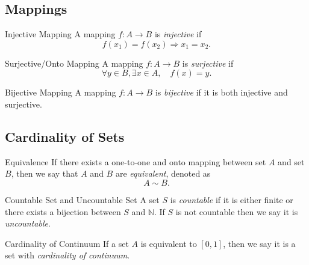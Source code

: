 \subsection{Mappings}

\begin{definition}{Injective Mapping}{}
  A mapping $f:A \rightarrow B$ is \emph{injective} if
  \begin{equation}
    f(x_1) = f(x_2) \Rightarrow x_1 = x_2.
  \end{equation}
\end{definition}

\begin{definition}{Surjective/Onto Mapping}{}
  A mapping $f:A \rightarrow B$ is \emph{surjective} if
  \begin{equation}
    \forall y \in B, \exists x \in A, \quad f(x) = y.
  \end{equation}
\end{definition}

\begin{definition}{Bijective Mapping}{}
  A mapping $f:A \rightarrow B$ is \emph{bijective} if it is both injective and surjective.
\end{definition}

\subsection{Cardinality of Sets}

\begin{definition}{Equivalence}{}
  If there exists a one-to-one and onto mapping between set $A$ and set $B$,
  then we say that $A$ and $B$ are \emph{equivalent}, denoted as
  \begin{equation}
    A \sim B.
  \end{equation}
\end{definition}

\begin{definition}{Countable Set and Uncountable Set}{}
  A set $S$ is \emph{countable} if it is either finite or there
  exists a bijection between $S$ and $\mathbb{N}$.
  If $S$ is not countable then we say it is \emph{uncountable}.
\end{definition}

\begin{definition}{Cardinality of Continuum}{}
  If a set $A$ is equivalent to $[0, 1]$,
  then we say it is a set with \emph{cardinality of continuum}.
\end{definition}

